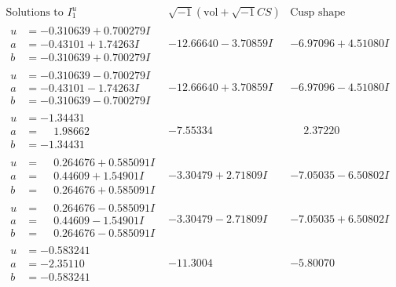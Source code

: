 \documentclass[1p]{elsarticle_modified}
\theoremstyle{definition}
\newcommand{\I}{\sqrt{-1}}
\begin{document}
$$\begin{array}{c|c|c}  
\text{Solutions to }I^u_{1}& \I (\text{vol} + \sqrt{-1}CS) & \text{Cusp shape}\\
 \hline 
\begin{aligned}
u &= -0.310639 + 0.700279 I \\
a &= -0.43101 + 1.74263 I \\
b &= -0.310639 + 0.700279 I\end{aligned}
 & -12.66640 - 3.70859 I & -6.97096 + 4.51080 I \\ \hline\begin{aligned}
u &= -0.310639 - 0.700279 I \\
a &= -0.43101 - 1.74263 I \\
b &= -0.310639 - 0.700279 I\end{aligned}
 & -12.66640 + 3.70859 I & -6.97096 - 4.51080 I \\ \hline\begin{aligned}
u &= -1.34431\phantom{ +0.000000I} \\
a &= \phantom{-}1.98662\phantom{ +0.000000I} \\
b &= -1.34431\phantom{ +0.000000I}\end{aligned}
 & -7.55334\phantom{ +0.000000I} & \phantom{-}2.37220\phantom{ +0.000000I} \\ \hline\begin{aligned}
u &= \phantom{-}0.264676 + 0.585091 I \\
a &= \phantom{-}0.44609 + 1.54901 I \\
b &= \phantom{-}0.264676 + 0.585091 I\end{aligned}
 & -3.30479 + 2.71809 I & -7.05035 - 6.50802 I \\ \hline\begin{aligned}
u &= \phantom{-}0.264676 - 0.585091 I \\
a &= \phantom{-}0.44609 - 1.54901 I \\
b &= \phantom{-}0.264676 - 0.585091 I\end{aligned}
 & -3.30479 - 2.71809 I & -7.05035 + 6.50802 I \\ \hline\begin{aligned}
u &= -0.583241\phantom{ +0.000000I} \\
a &= -2.35110\phantom{ +0.000000I} \\
b &= -0.583241\phantom{ +0.000000I}\end{aligned}
 & -11.3004\phantom{ +0.000000I} & -5.80070\phantom{ +0.000000I} \\ \hline\begin{aligned}

\end{aligned}
\end{array}$$
\end{document}
